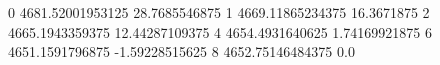 0 4681.52001953125 28.7685546875
1 4669.11865234375 16.3671875
2 4665.1943359375 12.44287109375
4 4654.4931640625 1.74169921875
6 4651.1591796875 -1.59228515625
8 4652.75146484375 0.0
